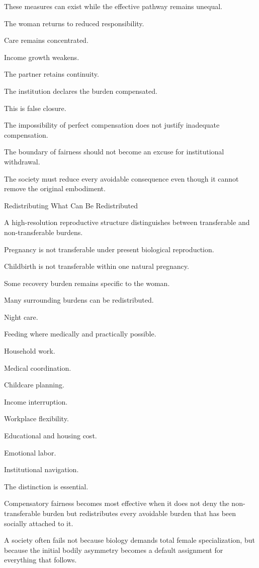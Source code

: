These measures can exist while the effective pathway remains unequal.

The woman returns to reduced responsibility.

Care remains concentrated.

Income growth weakens.

The partner retains continuity.

The institution declares the burden compensated.

This is false closure.

The impossibility of perfect compensation does not justify inadequate compensation.

The boundary of fairness should not become an excuse for institutional withdrawal.

The society must reduce every avoidable consequence even though it cannot remove the original embodiment.

Redistributing What Can Be Redistributed

A high-resolution reproductive structure distinguishes between transferable and non-transferable burdens.

Pregnancy is not transferable under present biological reproduction.

Childbirth is not transferable within one natural pregnancy.

Some recovery burden remains specific to the woman.

Many surrounding burdens can be redistributed.

Night care.

Feeding where medically and practically possible.

Household work.

Medical coordination.

Childcare planning.

Income interruption.

Workplace flexibility.

Educational and housing cost.

Emotional labor.

Institutional navigation.

The distinction is essential.

Compensatory fairness becomes most effective when it does not deny the non-transferable burden but redistributes every avoidable burden that has been socially attached to it.

A society often fails not because biology demands total female specialization, but because the initial bodily asymmetry becomes a default assignment for everything that follows.

